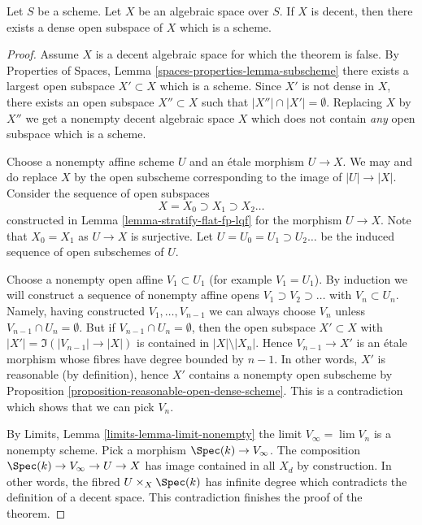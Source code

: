 \begin{theorem}
\label{theorem-decent-open-dense-scheme}
Let $S$ be a scheme. Let $X$ be an algebraic space over $S$.
If $X$ is decent, then there exists a dense open subspace
of $X$ which is a scheme.
\end{theorem}

\begin{proof}
Assume $X$ is a decent algebraic space for which the theorem is false. By
Properties of Spaces, Lemma \ref{spaces-properties-lemma-subscheme}
there exists a largest open subspace $X' \subset X$ which is a scheme.
Since $X'$ is not dense in $X$, there exists an open subspace
$X'' \subset X$ such that $|X''| \cap |X'| = \emptyset$. Replacing $X$
by $X''$ we get a nonempty decent algebraic space $X$ which does not
contain {\it any} open subspace which is a scheme.

\medskip\noindent
Choose a nonempty affine scheme $U$ and an \'etale morphism $U \to X$.
We may and do replace $X$ by the open subscheme corresponding to the
image of $|U| \to |X|$. Consider the sequence of open subspaces
$$
X = X_0 \supset X_1 \supset X_2 \ldots
$$
constructed in Lemma \ref{lemma-stratify-flat-fp-lqf}
for the morphism $U \to X$. Note that $X_0 = X_1$ as $U \to X$
is surjective. Let $U = U_0 = U_1 \supset U_2 \ldots$ be the induced
sequence of open subschemes of $U$.

\medskip\noindent
Choose a nonempty open affine $V_1 \subset U_1$ (for example $V_1 = U_1$).
By induction we will construct a sequence of nonempty affine opens
$V_1 \supset V_2 \supset \ldots$ with $V_n \subset U_n$. Namely, having
constructed $V_1, \ldots, V_{n - 1}$ we can always choose $V_n$ unless
$V_{n - 1} \cap U_n = \emptyset$. But if $V_{n - 1} \cap U_n = \emptyset$,
then the open subspace $X' \subset X$ with
$|X'| = \Im(|V_{n - 1}| \to |X|)$ is contained in $|X| \setminus |X_n|$.
Hence $V_{n - 1} \to X'$ is an \'etale morphism whose fibres have degree
bounded by $n - 1$. In other words, $X'$ is reasonable (by definition),
hence $X'$ contains a nonempty open subscheme by
Proposition \ref{proposition-reasonable-open-dense-scheme}.
This is a contradiction which shows that we can pick $V_n$.

\medskip\noindent
By Limits, Lemma \ref{limits-lemma-limit-nonempty}
the limit $V_\infty = \lim V_n$ is a nonempty scheme. Pick a morphism
$\Spec(k) \to V_\infty$. The composition $\Spec(k) \to V_\infty \to U \to X$
has image contained in all $X_d$ by construction. In other words, the
fibred $U \times_X \Spec(k)$ has infinite degree which contradicts
the definition of a decent space. This contradiction finishes the proof
of the theorem.
\end{proof}

